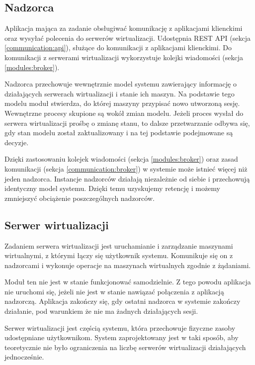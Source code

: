 \documentclass[../opis-rozwiazania.tex]{subfiles}
\begin{document}
\subsection{Nadzorca}
\label{modules:overseer}

Aplikacja mająca za zadanie obsługiwać komunikację z aplikacjami klienckimi oraz wysyłać polecenia do serwerów wirtualizacji. Udostępnia REST API (sekcja \ref{communication:api}), służące do komunikacji z aplikacjami klienckimi. Do komunikacji z serwerami wirtualizacji wykorzystuje kolejki wiadomości (sekcja \ref{modules:broker}).

Nadzorca przechowuje wewnętrznie model systemu zawierający informację o działających serwerach wirtualizacji i stanie ich maszyn. Na podstawie tego modelu moduł stwierdza, do której maszyny przypisać nowo utworzoną sesję. Wewnętrzne procesy skupione są wokół zmian modelu. Jeżeli proces wysłał do serwera wirtualizacji prośbę o zmianę stanu, to dalsze przetwarzanie odbywa się, gdy stan modelu został zaktualizowany i na tej podstawie podejmowane są decyzje.

Dzięki zastosowaniu kolejek wiadomości (sekcja \ref{modules:broker}) oraz zasad komunikacji (sekcja \ref{communication:broker}) w systemie może istnieć więcej niż jeden nadzorca. Instancje nadzorców działają niezależnie od siebie i przechowują identyczny model systemu. Dzięki temu uzyskujemy retencję i możemy zmniejszyć obciążenie poszczególnych nadzorców.

\subsection{Serwer wirtualizacji}
\label{modules:virtsrv}

Zadaniem serwera wirtualizacji jest uruchamianie i zarządzanie maszynami wirtualnymi, z którymi łączy się użytkownik systemu. Komunikuje się on z nadzorcami i wykonuje operacje na maszynach wirtualnych zgodnie z żądaniami.

Moduł ten nie jest w stanie funkcjonować samodzielnie. Z tego powodu aplikacja nie uruchomi się, jeżeli nie jest w stanie nawiązać połączenia z aplikacją nadzorczą. Aplikacja zakończy się, gdy ostatni nadzorca w systemie zakończy działanie, pod warunkiem że nie ma żadnych działających sesji.

Serwer wirtualizacji jest częścią systemu, która przechowuje fizyczne zasoby udostępniane użytkownikom.
System zaprojektowany jest w taki sposób, aby teoretycznie nie było ograniczenia na liczbę serwerów wirtualizacji działających jednocześnie.
\end{document}
